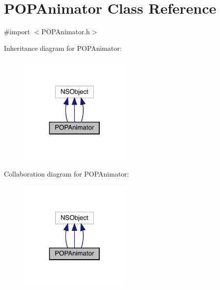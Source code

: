 \hypertarget{interface_p_o_p_animator}{}\section{P\+O\+P\+Animator Class Reference}
\label{interface_p_o_p_animator}


{\ttfamily \#import $<$P\+O\+P\+Animator.\+h$>$}



Inheritance diagram for P\+O\+P\+Animator\+:\nopagebreak
\begin{figure}[H]
\begin{center}
\leavevmode
\includegraphics[width=156pt]{interface_p_o_p_animator__inherit__graph}
\end{center}
\end{figure}


Collaboration diagram for P\+O\+P\+Animator\+:\nopagebreak
\begin{figure}[H]
\begin{center}
\leavevmode
\includegraphics[width=156pt]{interface_p_o_p_animator__coll__graph}
\end{center}
\end{figure}
